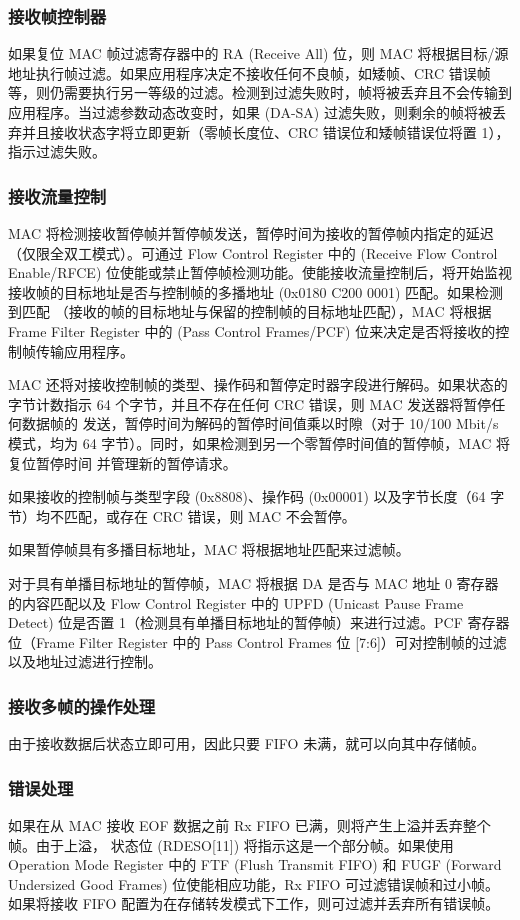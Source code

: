 \documentclass[main\_\_CN.tex]{subfiles}
\begin{document}
\subsubsection{接收帧控制器 }
如果复位 MAC 帧过滤寄存器中的 RA (Receive All) 位，则 MAC 将根据目标/源地址执行帧过滤。如果应用程序决定不接收任何不良帧，如矮帧、CRC 错误帧等，则仍需要执行另一等级的过滤。检测到过滤失败时，帧将被丢弃且不会传输到应用程序。当过滤参数动态改变时，如果 (DA-SA) 过滤失败，则剩余的帧将被丢弃并且接收状态字将立即更新（零帧长度位、CRC 错误位和矮帧错误位将置 1），指示过滤失败。

\subsubsection{接收流量控制 }
MAC 将检测接收暂停帧并暂停帧发送，暂停时间为接收的暂停帧内指定的延迟（仅限全双工模式）。可通过 Flow Control Register 中的 (Receive Flow Control Enable/RFCE) 位使能或禁止暂停帧检测功能。使能接收流量控制后，将开始监视接收帧的目标地址是否与控制帧的多播地址 (0x0180 C200 0001) 匹配。如果检测到匹配 （接收的帧的目标地址与保留的控制帧的目标地址匹配），MAC 将根据 Frame Filter Register 中的 (Pass Control Frames/PCF) 位来决定是否将接收的控制帧传输应用程序。

MAC 还将对接收控制帧的类型、操作码和暂停定时器字段进行解码。如果状态的字节计数指示 64 个字节，并且不存在任何 CRC 错误，则 MAC 发送器将暂停任何数据帧的 发送，暂停时间为解码的暂停时间值乘以时隙（对于 10/100 Mbit/s 模式，均为 64 字节）。同时，如果检测到另一个零暂停时间值的暂停帧，MAC 将复位暂停时间 并管理新的暂停请求。

如果接收的控制帧与类型字段 (0x8808)、操作码 (0x00001) 以及字节长度（64 字节）均不匹配，或存在 CRC 错误，则 MAC 不会暂停。

如果暂停帧具有多播目标地址，MAC 将根据地址匹配来过滤帧。

对于具有单播目标地址的暂停帧，MAC 将根据 DA 是否与 MAC 地址 0 寄存器的内容匹配以及 Flow Control Register 中的 UPFD (Unicast Pause Frame Detect) 位是否置 1（检测具有单播目标地址的暂停帧）来进行过滤。PCF 寄存器位（Frame Filter Register 中的 Pass Control Frames 位 [7:6]）可对控制帧的过滤以及地址过滤进行控制。

\subsubsection{接收多帧的操作处理}
由于接收数据后状态立即可用，因此只要 FIFO 未满，就可以向其中存储帧。
\subsubsection{错误处理 }
如果在从 MAC 接收 EOF 数据之前 Rx FIFO 已满，则将产生上溢并丢弃整个帧。由于上溢， 状态位 (RDESO[11]) 将指示这是一个部分帧。如果使用 Operation Mode Register 中的 FTF (Flush Transmit FIFO) 和 FUGF (Forward Undersized Good Frames) 位使能相应功能，Rx FIFO 可过滤错误帧和过小帧。如果将接收 FIFO 配置为在存储转发模式下工作，则可过滤并丢弃所有错误帧。
\end{document}
